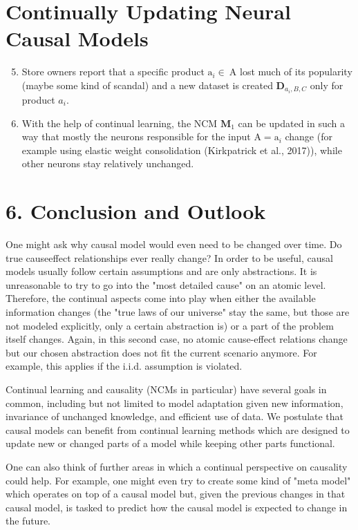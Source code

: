 \documentclass[10pt]{article}
\begin{document}
\section*{Continually Updating Neural Causal Models}
\begin{enumerate}
  \setcounter{enumi}{4}
  \item Store owners report that a specific product $\mathrm{a}_{i} \in \mathrm{~A}$ lost much of its popularity (maybe some kind of scandal) and a new dataset is created $\mathbf{D}_{a_{i}, B, C}$ only for product $a_{i}$.
  \item With the help of continual learning, the NCM $\mathbf{M}_{1}$ can be updated in such a way that mostly the neurons responsible for the input $\mathrm{A}=\mathrm{a}_{i}$ change (for example using elastic weight consolidation (Kirkpatrick et al., 2017)), while other neurons stay relatively unchanged.
\end{enumerate}

\section*{6. Conclusion and Outlook}
One might ask why causal model would even need to be changed over time. Do true causeeffect relationships ever really change? In order to be useful, causal models usually follow certain assumptions and are only abstractions. It is unreasonable to try to go into the "most detailed cause" on an atomic level. Therefore, the continual aspects come into play when either the available information changes (the "true laws of our universe" stay the same, but those are not modeled explicitly, only a certain abstraction is) or a part of the problem itself changes. Again, in this second case, no atomic cause-effect relations change but our chosen abstraction does not fit the current scenario anymore. For example, this applies if the i.i.d. assumption is violated.

Continual learning and causality (NCMs in particular) have several goals in common, including but not limited to model adaptation given new information, invariance of unchanged knowledge, and efficient use of data. We postulate that causal models can benefit from continual learning methods which are designed to update new or changed parts of a model while keeping other parts functional.

One can also think of further areas in which a continual perspective on causality could help. For example, one might even try to create some kind of "meta model" which operates on top of a causal model but, given the previous changes in that causal model, is tasked to predict how the causal model is expected to change in the future.
\end{document}
